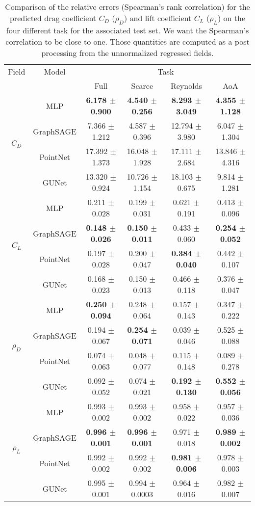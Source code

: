 \begin{table}
	\caption[Comparison of the force coefficients metrics.]{Comparison of the relative errors (Spearman's rank correlation) for the predicted drag coefficient $C_D$ ($\rho_D$) and lift coefficient $C_L$ ($\rho_L$) on the four different task for the associated test set. We want the Spearman's correlation to be close to one. Those quantities are computed as a post processing from the unnormalized regressed fields.}
	\label{tab:spear_comparison_corr}
	\centering
	\begin{tabular}{cccccc}
		\toprule
		Field & Model & \multicolumn{4}{c}{Task}  \\
		& & Full & Scarce & Reynolds & AoA \\
		\midrule
		\multirow{4}{*}{$C_D$} & MLP & \textbf{6.178 $\pm$ 0.900} & \textbf{4.540 $\pm$ 0.256} & \textbf{8.293 $\pm$ 3.049} & \textbf{4.355 $\pm$ 1.128} \\
		& GraphSAGE & 7.366 $\pm$ 1.212 & 4.587 $\pm$ 0.396 & 12.794 $\pm$ 3.980 & 6.047 $\pm$ 1.304 \\
		& PointNet & 17.392 $\pm$ 1.373 & 16.048 $\pm$ 1.928 & 17.111 $\pm$ 2.684 & 13.846 $\pm$ 4.316 \\
		& GUNet & 13.320 $\pm$ 0.924 & 10.726 $\pm$ 1.154 & 18.103 $\pm$ 0.675 & 9.814 $\pm$ 1.281 \\
		\midrule
		\multirow{4}{*}{$C_L$} & MLP & 0.211 $\pm$ 0.028 & 0.199 $\pm$ 0.031 & 0.621 $\pm$ 0.191 & 0.413 $\pm$ 0.096 \\
		& GraphSAGE & \textbf{0.148 $\pm$ 0.026} &  \textbf{0.150 $\pm$ 0.011} & 0.433 $\pm$ 0.060 & \textbf{0.254 $\pm$ 0.052} \\
		& PointNet & 0.197 $\pm$ 0.028 & 0.200 $\pm$ 0.047 & \textbf{0.384 $\pm$ 0.040} & 0.442 $\pm$ 0.107 \\
		& GUNet & 0.168 $\pm$ 0.023 & 0.150 $\pm$ 0.013 & 0.466 $\pm$ 0.118 & 0.376 $\pm$ 0.047 \\
		\midrule
		\multirow{4}{*}{$\rho_D$} & MLP & \textbf{0.250 $\pm$ 0.094} & 0.248 $\pm$ 0.064 & 0.157 $\pm$ 0.143 & 0.347 $\pm$ 0.222 \\
		& GraphSAGE & 0.194 $\pm$ 0.067 & \textbf{0.254 $\pm$ 0.071} & 0.039 $\pm$ 0.046 & 0.525 $\pm$ 0.088 \\
		& PointNet & 0.074 $\pm$ 0.063 & 0.048 $\pm$ 0.077 & 0.115 $\pm$ 0.148 & 0.089 $\pm$ 0.278 \\
		& GUNet & 0.092 $\pm$ 0.052 & 0.074 $\pm$ 0.021 & \textbf{0.192 $\pm$ 0.130} & \textbf{0.552 $\pm$ 0.056} \\
		\midrule
		\multirow{4}{*}{$\rho_L$} & MLP & 0.993 $\pm$ 0.002 & 0.993 $\pm$ 0.002 & 0.958 $\pm$ 0.022 & 0.957 $\pm$ 0.036 \\
		& GraphSAGE & \textbf{0.996 $\pm$ 0.001} & \textbf{0.996 $\pm$ 0.001} & 0.971 $\pm$ 0.018 & \textbf{0.989 $\pm$ 0.002} \\
		& PointNet & 0.992 $\pm$ 0.002 & 0.992 $\pm$ 0.002 & \textbf{0.981 $\pm$ 0.006} & 0.978 $\pm$ 0.003 \\
		& GUNet & 0.995 $\pm$ 0.001 & 0.994 $\pm$ 0.0003 & 0.964 $\pm$ 0.016 & 0.982 $\pm$ 0.007 \\
		\bottomrule
	\end{tabular}
\end{table}

